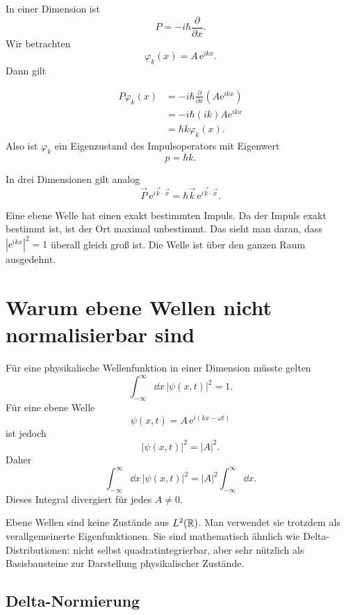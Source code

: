 In einer Dimension ist
\[
    P=-i\hbar\frac{\partial}{\partial x}.
\]
Wir betrachten
\[
    \varphi_k(x)=A\,\mathrm{e}^{ikx}.
\]
Dann gilt
\begin{derivationbox}
\[
\begin{aligned}
    P\varphi_k(x)
    &=-i\hbar\frac{\partial}{\partial x}\left(A\mathrm{e}^{ikx}\right) \\
    &=-i\hbar(ik)A\mathrm{e}^{ikx} \\
    &=\hbar k\varphi_k(x).
\end{aligned}
\]
Also ist $\varphi_k$ ein Eigenzustand des Impulsoperators mit Eigenwert
\[
    p=\hbar k.
\]
\end{derivationbox}

In drei Dimensionen gilt analog
\[
    \vec{P}\,\mathrm{e}^{i\vec{k}\cdot\vec{x}}
    =\hbar\vec{k}\,\mathrm{e}^{i\vec{k}\cdot\vec{x}}.
\]

\begin{conceptbox}
Eine ebene Welle hat einen exakt bestimmten Impuls. Da der Impuls exakt bestimmt ist, ist der Ort maximal unbestimmt. Das sieht man daran, dass $|\mathrm{e}^{ikx}|^2=1$ überall gleich groß ist. Die Welle ist über den ganzen Raum ausgedehnt.
\end{conceptbox}

\section{Warum ebene Wellen nicht normalisierbar sind}

Für eine physikalische Wellenfunktion in einer Dimension müsste gelten
\[
    \int_{-\infty}^{\infty}\dd x\,|\psi(x,t)|^2=1.
\]
Für eine ebene Welle
\[
    \psi(x,t)=A\,\mathrm{e}^{i(kx-\omega t)}
\]
ist jedoch
\[
    |\psi(x,t)|^2=|A|^2.
\]
Daher
\[
    \int_{-\infty}^{\infty}\dd x\,|\psi(x,t)|^2
    =|A|^2\int_{-\infty}^{\infty}\dd x.
\]
Dieses Integral divergiert für jedes $A\neq 0$.

\begin{notebox}
Ebene Wellen sind keine Zustände aus $L^2(\mathbb{R})$. Man verwendet sie trotzdem als verallgemeinerte Eigenfunktionen. Sie sind mathematisch ähnlich wie Delta-Distributionen: nicht selbst quadratintegrierbar, aber sehr nützlich als Basisbausteine zur Darstellung physikalischer Zustände.
\end{notebox}

\subsection{Delta-Normierung}


